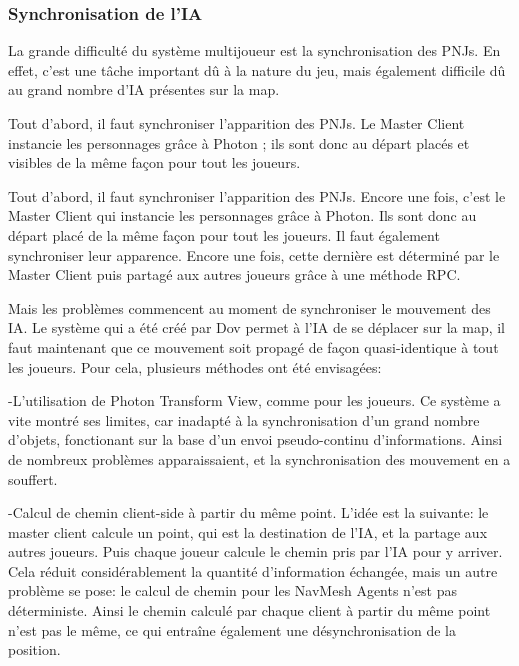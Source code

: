     \subsubsection{Synchronisation de l'IA}

        La grande difficulté du système multijoueur est la synchronisation des PNJs. En effet, c'est une tâche important dû à la nature du jeu, 
        mais également difficile dû au grand nombre d'IA présentes sur la map.

        Tout d'abord, il faut synchroniser l'apparition des PNJs. Le Master Client instancie les personnages grâce à Photon ; ils sont donc au départ 
        placés et visibles de la même façon pour tout les joueurs.

        Tout d'abord, il faut synchroniser l'apparition des PNJs. Encore une fois, c'est le Master Client qui instancie les personnages
        grâce à Photon. Ils sont donc au départ placé de la même façon pour tout les joueurs. Il faut également synchroniser leur apparence.
        Encore une fois, cette dernière est déterminé par le Master Client puis partagé aux autres joueurs grâce à une méthode RPC.


        Mais les problèmes commencent au moment de synchroniser le mouvement des IA. Le système qui a été créé par Dov permet
        à l'IA de se déplacer sur la map, il faut maintenant que ce mouvement soit propagé de façon quasi-identique à tout les joueurs.
        Pour cela, plusieurs méthodes ont été envisagées:

            -L'utilisation de Photon Transform View, comme pour les joueurs. Ce système a vite montré ses limites, car inadapté à la synchronisation
            d'un grand nombre d'objets, fonctionant sur la base d'un envoi pseudo-continu d'informations. Ainsi de nombreux problèmes apparaissaient,
            et la synchronisation des mouvement en a souffert. 

            -Calcul de chemin client-side à partir du même point. L'idée est la suivante: le master client calcule un point, qui est la destination
            de l'IA, et la partage aux autres joueurs. Puis chaque joueur calcule le chemin pris par l'IA pour y arriver. Cela réduit considérablement la
            quantité d'information échangée, mais un autre problème se pose: le calcul de chemin pour les NavMesh Agents n'est pas déterministe. Ainsi le
            chemin calculé par chaque client à partir du même point n'est pas le même, ce qui entraîne également une désynchronisation de la position.

